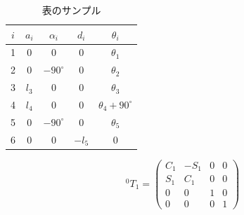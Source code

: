 \documentclass[uplatex, a4paper]{jsarticle}
\begin{document}
  \begin{table}[h]
    \begin{center}
      \caption{表のサンプル}
      \begin{tabular}{|c||c|c|c|c|} \hline
        $i$ & $a_{i}$ & $\alpha_{i}$  & $d_{i}$  & $\theta_{i}$             \\ \hline \hline
         1  &    0    &       0       &    0     & $\theta_{1}$             \\ \hline
         2  &    0    & $-90^{\circ}$ &    0     & $\theta_{2}$             \\ \hline
         3  & $l_{3}$ &       0       &    0     & $\theta_{3}$             \\ \hline
         4  & $l_{4}$ &       0       &    0     & $\theta_{4}+90^{\circ}$  \\ \hline
         5  &    0    & $-90^{\circ}$ &    0     & $\theta_{5}$             \\ \hline
         6  &    0    &       0       & $-l_{5}$ &    0                     \\ \hline
      \end{tabular}
      \label{tab:dhparameter}
    \end{center}
  \end{table}

  \begin{equation}
  {}^0\!T_{1}=\begin{pmatrix} C_{1} & -S_{1} & 0 & 0 \\ S_{1} & C_1 & 0 & 0 \\ 0 & 0 & 1 & 0 \\ 0 & 0 & 0 & 1 \end{pmatrix}
  \end{equation}
\end{document}

